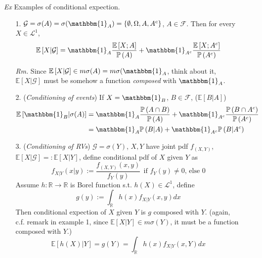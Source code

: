 \documentclass[a4paper,12pt,twoside]{book}
\begin{document}
\begin{itemize}
\begin{itemize}
 		\item[\textit{Ex}] Examples of conditional expection. 
 		\begin{itemize}
 			\item[1.] $\mathcal{G}=\sigma(A)=\sigma(\mathbbm{1}_{A})=\{\emptyset, \Omega, A, A^{c}\}$, $A \in \mathcal{F}$. Then for every $X \in \mathcal{L}^1$, 
 			\begin{equation}
 				\mathbb{E}\left[X|\mathcal{G}\right]=\mathbbm{1}_{A}\frac{\mathbb{E}\left[X; A\right]}{\mathbb{P}\left(A\right)}+\mathbbm{1}_{A^c} \frac{\mathbb{E}\left[X;A^c\right]}{\mathbb{P}\left(A^c\right)}
 			\end{equation}
 			\item[\textit{Rm.}] Since $\mathbb{E}\left[X|\mathcal{G}\right]\in m\sigma(A)=m\sigma(\mathbbm{1}_{A}$, think about it, $\mathbb{E}\left[X|\mathcal{G}\right]$ must be somehow a function \textit{composed} with $\mathbbm{1}_{A}$.

 			\item[2.] (\textit{Conditioning of events}) If $X=\mathbbm{1}_{B}$, $B\in \mathcal{F}$, ($\mathbb{E}\left[B|A\right]$)
 			\begin{equation}
 				\begin{split}
 					\mathbb{E}\left[\mathbbm{1}_{B}|\sigma(A)\right]&=\mathbbm{1}_{A}\frac{\mathbb{P}\left(A \cap B\right)}{\mathbb{P}\left(A\right)}+\mathbbm{1}_{A^c}\frac{\mathbb{P}\left(B\cap A^c\right)}{\mathbb{P}\left(A^c\right)}\\
 					&=\mathbbm{1}_{A}\mathbb{P}\left(B|A\right)+\mathbbm{1}_{A^c}\mathbb{P}\left(B|A^c\right)
 				\end{split}
 			\end{equation}

 			\item[3.] (\textit{Conditioning of RVs}) $\mathcal{G}=\sigma(Y)$, $X,Y$ have joint pdf $f_{(X,Y)}$, $\mathbb{E}\left[X|\mathcal{G}\right]=:\mathbb{E}\left[X|Y\right]$, define conditional pdf of $X$ given $Y$ as
 			\begin{equation}
 				f_{X|Y}(x|y):=\frac{f_{(X,Y)}(x,y)}{f_Y(y)}~~\text{if $f_Y(y)\ne 0$, else $0$}
 			\end{equation}
 			Assume $h: \mathbb{R}\to \mathbb{R}$ is Borel function s.t. $h(X) \in \mathcal{L}^1$, define
 			\begin{equation}
 				g(y):=\int_{\mathbb{R}}h(x)f_{X|Y}(x,y)dx
 			\end{equation}
 			Then conditional expection of $X$ given $Y$ is $g$ composed with $Y$. (again, c.f. remark in example 1, since $\mathbb{E}\left[X|Y\right]\in m\sigma(Y)$, it must be a function composed with $Y$.)
 			\begin{equation}
 				\mathbb{E}\left[h(X)|Y\right]=g(Y)=\int_{\mathbb{R}}h(x)f_{X|Y}(x,Y)dx
 			\end{equation}
 		\end{itemize}
	\end{itemize}
\end{itemize}
\end{document}
